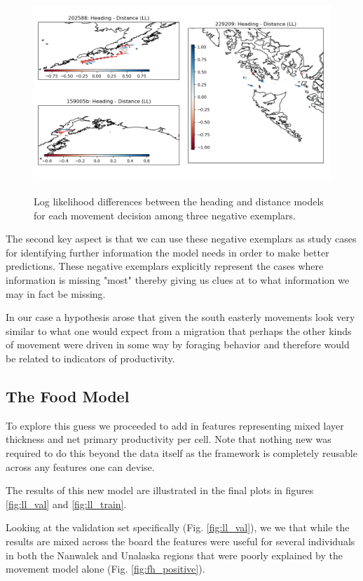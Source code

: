 \documentclass[11pt]{article}
\begin{document}
\begin{figure}[h!] 
	\centering
  \includegraphics[height=75mm]{figures/hd_negative.png}
  \caption{Log likelihood differences between the heading and distance models for each movement decision among three negative exemplars.}
  \label{fig:hd_negative}
\end{figure}

The second key aspect is that we can use these negative exemplars as study cases for identifying further information the model needs in order to make better predictions. These negative exemplars explicitly represent the cases where information is missing "most" thereby giving us clues at to what information we may in fact be missing. 

In our case a hypothesis arose that given the south easterly movements look very similar to what one would expect from a migration that perhaps the other kinds of movement were driven in some way by foraging behavior and therefore would be related to indicators of productivity. 

\subsection*{The Food Model}

To explore this guess we proceeded to add in features representing mixed layer thickness and net primary productivity per cell. Note that nothing new was required to do this beyond the data itself as the framework is completely reusable across any features one can devise. 

The results of this new model are illustrated in the final plots in figures \ref{fig:ll_val} and \ref{fig:ll_train}. 

Looking at the validation set specifically (Fig. \ref{fig:ll_val}), we we that while the results are mixed across the board the features were useful for several individuals in both the Nanwalek and Unalaska regions that were poorly explained by the movement model alone (Fig. \ref{fig:fh_positive}). 
\end{document}
